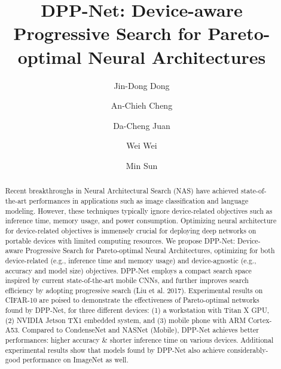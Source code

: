 \documentclass[runningheads]{llncs}
\begin{document}
\title{DPP-Net: Device-aware Progressive Search for Pareto-optimal Neural Architectures} 

\author{Jin-Dong Dong \and An-Chieh Cheng \and Da-Cheng Juan \and Wei Wei \and Min Sun}

\maketitle              %
\begin{abstract}
Recent breakthroughs in Neural Architectural Search (NAS) have achieved state-of-the-art performances in applications such as image classification and language modeling. However, these techniques typically ignore device-related objectives such as inference time, memory usage, and power consumption. Optimizing neural architecture for device-related objectives is immensely crucial for deploying deep networks on portable devices with limited computing resources. We propose DPP-Net: Device-aware Progressive Search for Pareto-optimal Neural Architectures, optimizing for both device-related (e.g., inference time and memory usage) and device-agnostic (e.g., accuracy and model size) objectives.
DPP-Net employs a compact search space inspired by current state-of-the-art mobile CNNs, and further improves search efficiency by adopting progressive search (Liu et al. 2017).
Experimental results on CIFAR-10 are poised to demonstrate the effectiveness of Pareto-optimal networks found by DPP-Net, for three different devices: (1) a workstation with Titan X GPU, (2) NVIDIA Jetson TX1 embedded system, and (3) mobile phone with ARM Cortex-A53. Compared to CondenseNet and NASNet (Mobile), DPP-Net achieves better performances: higher accuracy \& shorter inference time on various devices. Additional experimental results show that models found by DPP-Net also achieve considerably-good performance on ImageNet as well.

\end{abstract}
\end{document}
